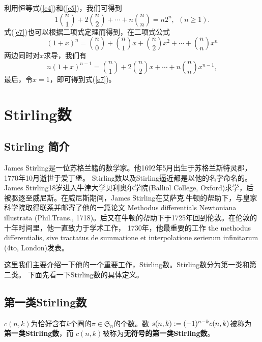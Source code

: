 利用恒等式(\ref{e4})和(\ref{e5})，我们可得到
\begin{equation}\label{e7}
1{n\choose 1}+2{n\choose 2}+\cdots+n{n \choose n}=n2^n,\ \ (n\geq
1).
\end{equation}
式(\ref{e7})也可以根据二项式定理而得到，在二项式公式
$$(1+x)^n={n\choose 0}+{n\choose 1}x+{n\choose 2}x^2+\cdots+{n\choose n}x^n$$
两边同时对$x$求导，我们有
$$n(1+x)^{n-1}={n\choose 1}+2{n\choose 2}x+\cdots+n{n\choose n}x^{n-1},$$
最后，令$x=1$，即可得到式(\ref{e7})。





\section{Stirling数}

\subsection{Stirling 简介} James
Stirling是一位苏格兰籍的数学家。他1692年5月出生于苏格兰斯特灵郡，1770年10月逝世于爱丁堡。
Stirling数以及Stirling逼近都是以他的名字命名的。James
Stirling18岁进入牛津大学贝利奥尔学院(Balliol College,
Oxford)求学，后被驱逐至威尼斯。在威尼斯期间，James
Stirling在艾萨克.牛顿的帮助下，与皇家科学院取得联系并邮寄了他的一篇论文
Methodus differentials Newtoniana illustrata (Phil.Trans.,
1718)。后又在牛顿的帮助下于1725年回到伦敦。在伦敦的十年时间里，他一直致力于学术工作，
1730年，他最重要的工作 the methodus differentialis, sive tractatus
de summatione et interpolatione serierum infinitarum (4to,
London)发表。

这里我们主要介绍一下他的一个重要工作，Stirling数。Stirling数分为第一类和第二类。
下面先看一下Stirling数的具体定义。

\subsection{第一类Stirling数}

\begin{defi}
$c(n,k)$为恰好含有$k$个圈的$\pi\in\mathfrak{S}_n$的个数。数
$s(n,k):=(-1)^{n-k}\\c(n,k)$被称为{\bf
第一类Stirling数}，而 $c(n,k)$被称为{\bf 无符号的第一类Stirling数}。
\end{defi}

